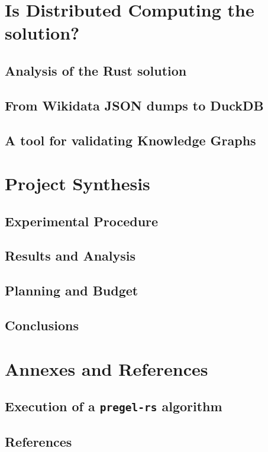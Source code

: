 \documentclass{legrand}
\begin{document}
\part{Is Distributed Computing the solution?}

\chapter{Analysis of the Rust solution}
\label{chapter:analysis}


\chapter{From Wikidata JSON dumps to DuckDB}
\label{chapter:wd2duckdb}


\chapter{A tool for validating Knowledge Graphs}
\label{chapter:pschema}


\part{Project Synthesis}

\chapter{Experimental Procedure}
\label{chapter:experiment}


\chapter{Results and Analysis}
\label{chapter:results}


\chapter{Planning and Budget}
\label{chapter:planning}


\chapter{Conclusions}
\label{chapter:conclusions}


\part{Annexes and References}

\appendix
\chapter{Execution of a \texttt{pregel-rs} algorithm}
\label{appendix:trace}


\chapter{References} %
\printbibliography[heading=bibempty]
\end{document}
